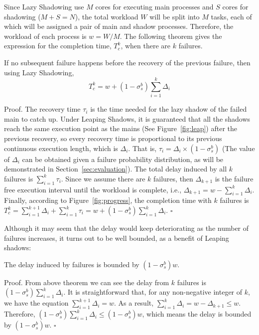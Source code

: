 Since Lazy Shadowing use $M$ cores for executing main processes and $S$ cores for shadowing ($M+S=N$), the total workload $W$ will be split into $M$ tasks, each of which will be assigned a pair of main and shadow processes. Therefore, the workload of each process is 
$w=W/M$. The following theorem gives the expression for the completion time, $T_c^k$, when there are $k$ failures.

\begin{theorem}
If no subsequent failure happens before the recovery of the previous failure, then using Lazy Shadowing, 
	$$T_c^k = w + (1-\sigma_s^b)\sum_{i=1}^k\Delta_i$$
\end{theorem}
{\sc Proof}. The recovery time $\tau_i$ is the time needed for the lazy shadow of the failed main to catch up. Under Leaping Shadows, it is guaranteed that all the shadows reach the same execution point as the mains (See Figure~\ref{fig:leap}) after the previous recovery, so every recovery time is proportional to its previous continuous execution length, which is $\Delta_i$. That is, $\tau_i = \Delta_i \times (1 - \sigma_s^b)$ (The value of $\Delta_i$ can be obtained given a failure probability distribution, as will be demonstrated in Section~\ref{sec:evaluation}). The total delay induced by all $k$ failures is $\sum_{i=1}^k\tau_i$.
Since we assume there are $k$ failures, then $\Delta_{k+1}$ is the failure free execution interval until the workload is complete, i.e., $\Delta_{k+1} = w - \sum_{i=1}^{k}\Delta_i$. Finally, according to Figure~\ref{fig:progress}, the completion time with $k$ failures is 
	$T_c^k = \sum_{i=1}^{k+1}\Delta_i + \sum_{i=1}^k\tau_i = w + (1-\sigma_s^b)\sum_{i=1}^k\Delta_i$.
    $\square$

Although it may seem that the delay would keep deteriorating as the number of failures increases, 
it turns out to be well bounded, as a benefit of Leaping shadows:

\begin{corollary}
The delay induced by failures is bounded by $(1-\sigma_s^b)w$.
\end{corollary}

{\sc Proof}. From above theorem we can see the delay from $k$ failures is $(1-\sigma_s^b)\sum_{i=1}^k\Delta_i$. It is straightforward that, for any non-negative integer of $k$, we have the equation $\sum_{i=1}^{k+1}\Delta_i= w$. As a result, 
$\sum_{i=1}^{k}\Delta_i = w - \Delta_{k+1} \le w$. Therefore, $(1-\sigma_s^b)\sum_{i=1}^k\Delta_i \le (1-\sigma_s^b)w$, which means the delay is bounded by $(1-\sigma_s^b)w$.
$\square$

